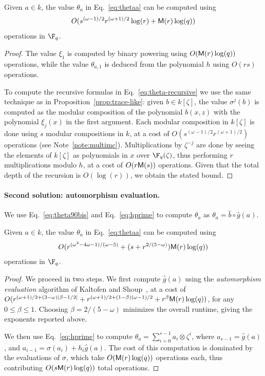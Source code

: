 \begin{proposition}
  \label{prop:xitheta}
  Given $a\in k$, the value $\theta_a$ in Eq.~\eqref{eq:thetaa} can be
  computed using \[
O(s^{(\omega-1)/2}r^{(\omega+1)/2}\log(r)+\mathsf{M}(r)\log(q))
\]
  operations in $\F_q$.
\end{proposition}
\begin{proof}
  The value $\xi_1$ is computed by binary powering using
  $O(\mathsf{M}(r)\log(q))$ operations, while the value $\theta_{a,1}$ is
  deduced from the polynomial $h$ using $O(rs)$ operations.
  
  To compute the recursive formulas in Eq.~\eqref{eq:theta-recursive}
  we use the same technique as in Proposition~\ref{prop:trace-like}:
  given $b \in k[\zeta]$, the value $\sigma^j(b)$ is computed as the
  modular composition of the polynomial $b(x,z)$ with the polynomial
  $\xi_j(x)$ in the first argument. %
  Each modular composition in $k[\zeta]$ is done using $s$ 
  modular compositions in $k$, at a cost of $O(s^{(\omega-1)/2}r^{(\omega+1)/2})$ operations (see Note~\ref{note:multimc}). %
  Multiplications by $\zeta^{-j}$ are done by seeing the elements of
  $k[\zeta]$ as polynomials in $x$ over $\F_q(\zeta)$, thus performing
  $r$ multiplications modulo $h$, at a cost of $O(r\mathsf{M}(s))$
  operations. %
  Given that the total depth of the recursion is $O(\log(r))$, we
  obtain the stated bound.
\end{proof}

\paragraph{\bf Second solution: automorphism evaluation.}
We use Eq.~\eqref{eq:theta90bis} and Eq.~\eqref{eq:hprime}
to compute $\theta_a$ as
$\theta_a = \hat{b}\circ \hat{g} (a)$.
\begin{proposition}
  \label{prop:ks-theta}
  Given $a\in k$, the value $\theta_a$ in Eq.~\eqref{eq:thetaa} can
  be computed using
  \[
  O(r^{(\omega^2-4\omega-1)/(\omega-5)}+(s+r^{2/(5-\omega)})\mathsf{M}(r)\log(q))
  \]
  operations in $\F_q$.
\end{proposition}
\begin{proof}
  We proceed in two steps. We first compute $\hat{g}(a)$ using the
  \emph{automorphism evaluation} algorithm of Kaltofen and
  Shoup~\cite[Algorithm~AE]{kaltofen+shoup98}, at a cost of
  $O(r^{(\omega+1)/2 + (3-\omega)\lvert\beta-1/2\rvert}+
  r^{(\omega+1)/2 + (1-\beta)(\omega-1)/2}+r^\beta\mathsf{M}(r)\log(q))$, for
  any $0\le\beta\le1$. Choosing $\beta=2/(5-\omega)$ minimizes the
  overall runtime, giving the exponents reported above.
  
  We then use Eq.~\eqref{eq:hprime} to compute
  $\theta_a=\sum_{i=0}^{s-1}a_i\otimes\zeta^i$, where
  $a_{s-1}=\hat{g}(a)$, and $a_{i-1}=\sigma(a_i)+h_i\hat{g}(a)$. 
  The cost of this computation is dominated by the evaluations of
  $\sigma$, which take $O(\mathsf{M}(r)\log(q))$ operations each, thus
  contributing $O(s\mathsf{M}(r)\log(q))$ total operations.
\end{proof}


